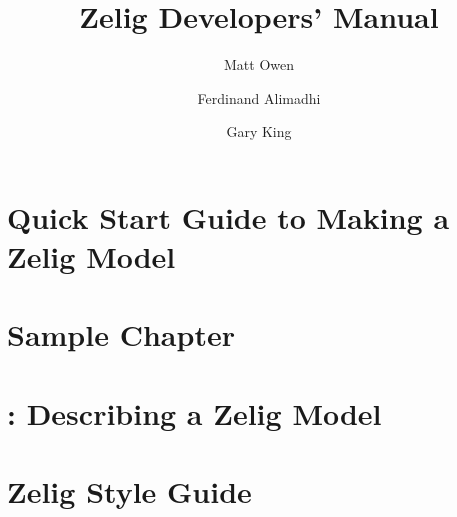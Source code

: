 \documentclass{book}
\title{Zelig Developers' Manual \code{v1.0}}
\author{Matt Owen \and Ferdinand Alimadhi \and Gary King}
\begin{document}
\maketitle


\tableofcontents


\chapter[Quick Start Guide]{Quick Start Guide to Making a Zelig Model}
\label{chapter:quickstart}



\chapter[sample]{Sample Chapter}
\label{chapter:sample}



\chapter[\code{describe}]{: Describing a Zelig Model}
\label{chapter:describe}



\chapter[\code{zelig2}]{}
\label{chapter:zelig2}



\chapter[\code{param}]{}
\label{chapter:param}



\chapter[\code{qi}]{}
\label{chapter:qi}



\chapter[Zelig Style Guide]{Zelig Style Guide}
\label{chapter:styleguide}

\end{document}
